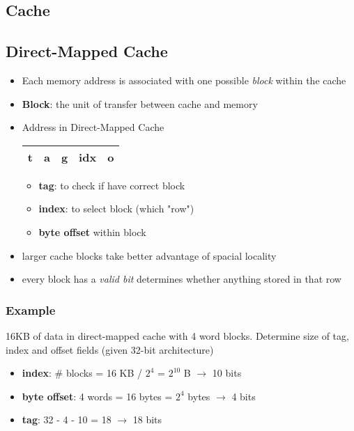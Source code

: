 \documentclass{../cheatsheet}
\begin{document}
\begin{multicols*}{2}
    \section{Cache}
    \subsection{Direct-Mapped Cache}
    \begin{itemize}
        \item Each memory address is associated with one possible \textit{block}
            within the cache
        \item \textbf{Block}: the unit of transfer between cache and memory
        \item Address in Direct-Mapped Cache\\
            \begin{tabular}{|c c c | c | c|}
                \hline
                t & a & g & idx & o \\
                \hline
            \end{tabular}
            \begin{itemize}
                \item \textbf{tag}: to check if have correct block
                \item \textbf{index}: to select block (which "row")
                \item \textbf{byte offset} within block
            \end{itemize}
        \item larger cache blocks take better advantage of spacial locality
        \item every block has a \textit{valid bit} determines whether anything
            stored in that row
    \end{itemize}

    \subsubsection{Example}
    16KB of data in direct-mapped cache with 4 word blocks. Determine size of
    tag, index and offset fields (given 32-bit architecture)
    \begin{itemize}
        \item \textbf{index}: \# blocks = 16 KB / $2^4$ = $2^{10}$ B
            $\rightarrow$ 10 bits
        \item \textbf{byte offset}: 4 words = 16 bytes = $2^4$ bytes
            $\rightarrow$ 4 bits
        \item \textbf{tag}: 32 - 4 - 10 = 18 $\rightarrow$ 18 bits
    \end{itemize}


\end{multicols*}
\end{document}
